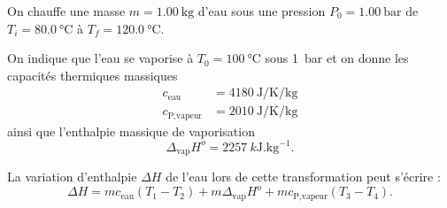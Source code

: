 

\finEntrainement



\newpage




\hauteurLargeurCadreReponse		{7mm}{3cm}
\typeEntrainement				{} %
\initialisationEntrainement

On chauffe une masse $m=\SI{1,00}{\kilogram}$ d'eau sous une pression $P_0=\SI{1,00}{\bar}$ de $T_i=\SI{80,0}{\celsius}$ à $T_f=\SI{120,0}{\celsius}$.

\smallskip

On indique que l'eau se vaporise à $T_0=\SI{100}{\celsius}$ sous \SI{1}{\bar} et on donne les capacités thermiques massiques 
\begin{align*}
c_{\text{eau}}&=\SI{4180}{\joule\per\kelvin\per\kilogram}\\
c_{\text{P,vapeur}}&=\SI{2010}{\joule\per\kelvin\per\kilogram}
\end{align*}
ainsi que l'enthalpie massique de vaporisation 
\[
\Delta_\text{vap}H^o=\SI{2257}{k\joule.\kilogram^{-1}}.
\]

\medskip

\debutEntrainement

La variation d'enthalpie $\Delta H$ de l'eau lors de cette transformation peut s'écrire : 
	\[
	\Delta H=mc_\text{eau}(T_1-T_2)+m\Delta_\text{vap}H^o+mc_\text{P,vapeur}(T_3-T_4).
	\]




